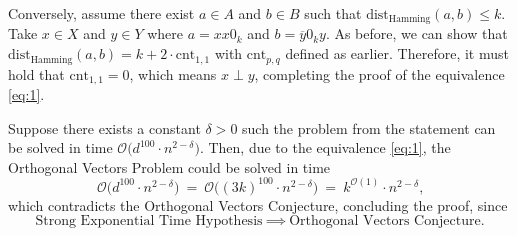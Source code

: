 \documentclass[12pt]{article}
\begin{document}
	\medskip
	
	Conversely, assume there exist \(a \in A\) and \(b \in B\) such that
	\(\text{dist}_{\text{Hamming}}(a, b) \leqslant k\). Take \(x \in X\) and \(y
	\in Y\) where \(a = xx0_{k}\) and \(b = \overline{y}0_{k}y\). As before, we
	can show that \(\text{dist}_{\text{Hamming}}(a, b) = k + 2 \cdot
	\text{cnt}_{1, 1}\) with \(\text{cnt}_{p, q}\) defined as earlier.
	Therefore, it must hold that \(\text{cnt}_{1, 1} = 0\), which means \(x
	\perp y\), completing the proof of the equivalence \eqref{eq:1}.
	
	\medskip
	
	Suppose there exists a constant \(\delta > 0\) such the problem from the
	statement can be solved in time \(\mathcal{O} \big( d^{100} \cdot n^{2 -
	\delta} \big)\). Then, due to the equivalence \eqref{eq:1}, the Orthogonal
	Vectors Problem could be solved in time
	\[ \mathcal{O} \big( d^{100} \cdot n^{2 - \delta} \big) \ = \ \mathcal{O}
	\big( (3k)^{100} \cdot n^{2 - \delta} \big) \ = \ k^{\mathcal{O}(1)} \cdot
	n^{2 - \delta} \text{,} \]
	which contradicts the Orthogonal Vectors Conjecture, concluding the proof,
	since
	\[ \text{Strong Exponential Time Hypothesis} \ \implies \
	\text{Orthogonal Vectors Conjecture.} \]
\end{document}
